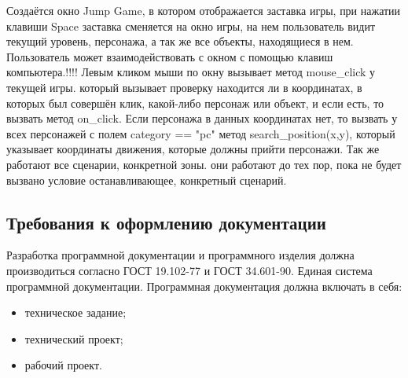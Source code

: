 Создаётся окно Jump Game, в котором отображается  заставка игры, при нажатии клавиши Space заставка сменяется на окно игры, на нем пользователь видит текущий уровень, персонажа, а так же все объекты, находящиеся в нем. Пользователь может взаимодействовать с окном с помощью клавиш компьютера.!!!! Левым кликом мыши по окну вызывает метод mouse\_click у текущей игры. который вызывает проверку находится ли в координатах, в которых был совершён клик, какой-либо персонаж или объект, и если есть, то вызвать метод on\_click. Если персонажа в данных координатах нет, то вызвать у всех персонажей с полем category == "pc" метод search\_position(x,y), который указывает координаты движения, которые должны прийти персонажи. Так же работают все сценарии, конкретной зоны. они работают до тех пор, пока не будет вызвано условие останавливающее, конкретный сценарий.


\subsection{Требования к оформлению документации}

Разработка программной документации и программного изделия должна производиться согласно ГОСТ 19.102-77 и ГОСТ 34.601-90. Единая система программной документации.
Программная документация должна включать в себя:
\begin{itemize}
	\item техническое задание;
	\item технический проект;
	\item рабочий проект.
\end{itemize}